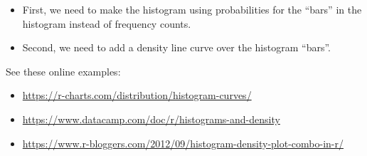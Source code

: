 \documentclass[
  letterpaper,
  DIV=11,
  numbers=noendperiod]{scrartcl}
\newenvironment{Shaded}{\begin{snugshade}}{\end{snugshade}}
\newcommand{\AttributeTok}[1]{\textcolor[rgb]{0.40,0.45,0.13}{#1}}
\newcommand{\CommentTok}[1]{\textcolor[rgb]{0.37,0.37,0.37}{#1}}
\newcommand{\ConstantTok}[1]{\textcolor[rgb]{0.56,0.35,0.01}{#1}}
\newcommand{\FunctionTok}[1]{\textcolor[rgb]{0.28,0.35,0.67}{#1}}
\newcommand{\NormalTok}[1]{\textcolor[rgb]{0.00,0.23,0.31}{#1}}
\newcommand{\SpecialCharTok}[1]{\textcolor[rgb]{0.37,0.37,0.37}{#1}}
\newcommand{\StringTok}[1]{\textcolor[rgb]{0.13,0.47,0.30}{#1}}
\providecommand{\tightlist}{%
  \setlength{\itemsep}{0pt}\setlength{\parskip}{0pt}}\usepackage{longtable,booktabs,array}
\begin{document}
\begin{itemize}
\tightlist
\item
  First, we need to make the histogram using probabilities for the
  ``bars'' in the histogram instead of frequency counts.
\item
  Second, we need to add a density line curve over the histogram
  ``bars''.
\end{itemize}

See these online examples:

\begin{itemize}
\tightlist
\item
  \url{https://r-charts.com/distribution/histogram-curves/}
\item
  \url{https://www.datacamp.com/doc/r/histograms-and-density}
\item
  \url{https://www.r-bloggers.com/2012/09/histogram-density-plot-combo-in-r/}
\end{itemize}

\begin{Shaded}
\end{Shaded}
\end{document}
